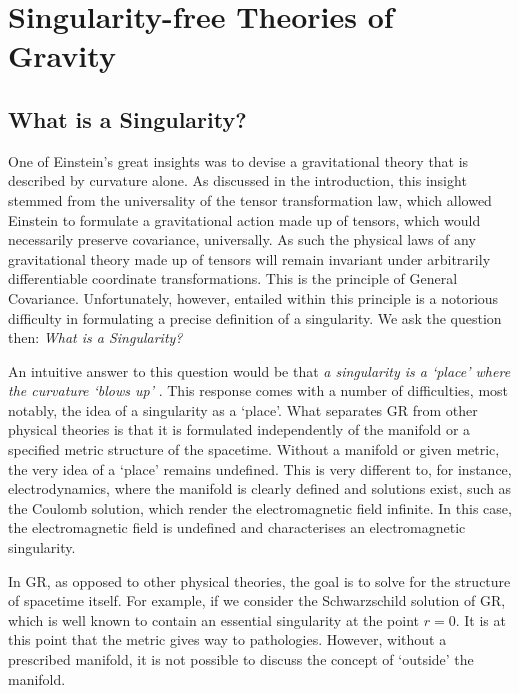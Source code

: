 \chapter{Singularity-free Theories of Gravity}
\label{chap:sing}
\section{What is a Singularity?}
One of Einstein's great insights was to devise a gravitational theory that is described by curvature alone. As discussed in the introduction, this insight stemmed from the universality of the tensor transformation law, which allowed Einstein to formulate a gravitational action made up of tensors, which would necessarily preserve covariance, universally. As such the physical laws of any gravitational theory made up of tensors will remain invariant under arbitrarily differentiable coordinate transformations. This is the principle of General Covariance. Unfortunately, however, entailed within this principle is a notorious difficulty in formulating a precise definition of a singularity.  We ask the question then: \emph{What is a Singularity?} \cite{Geroch:1968ut}

An intuitive answer to this question would be that \emph{a singularity is a `place' where the curvature `blows up'} \cite{Wald:GR}. This response comes with a number of difficulties, most notably, the idea of a singularity as a `place'. What separates GR from other physical theories is that it is formulated independently of the manifold or a specified metric structure of the spacetime. Without a manifold or given metric, the very idea of a `place' remains undefined. This is very different to, for instance, electrodynamics, where the manifold is clearly defined and solutions exist, such as the Coulomb solution, which render the electromagnetic field infinite. In this case, the electromagnetic field is undefined and characterises an electromagnetic singularity.

In GR, as opposed to other physical theories, the goal is to solve for the structure of spacetime itself. For example, if we consider the Schwarzschild solution of GR, which is  well known to contain an essential singularity at the point $r=0$. It is at this point that the metric gives way to pathologies. However, without a prescribed manifold, it is not possible to discuss the concept of `outside' the manifold.
%

